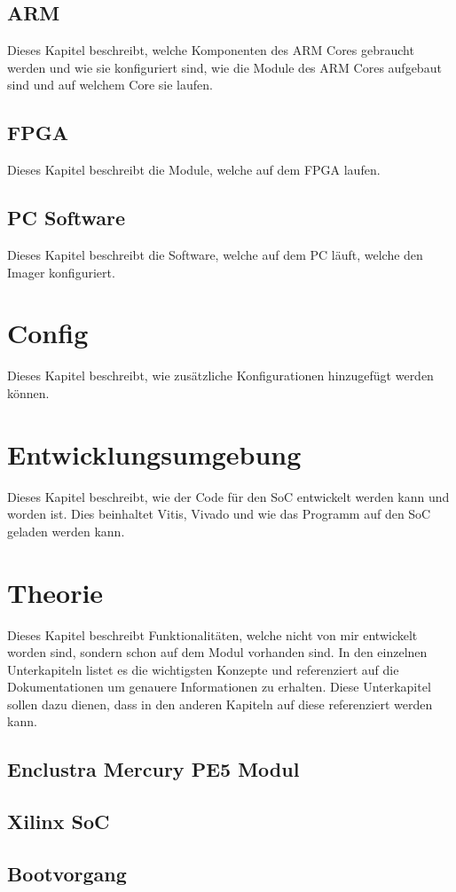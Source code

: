 \documentclass{article}
\begin{document}
\subsection{ARM}
Dieses Kapitel beschreibt, welche Komponenten des ARM Cores gebraucht werden und wie sie konfiguriert sind, wie die Module des ARM Cores aufgebaut sind und auf welchem Core sie laufen.
\subsection{FPGA}
Dieses Kapitel beschreibt die Module, welche auf dem FPGA laufen.
\subsection{PC Software}
Dieses Kapitel beschreibt die Software, welche auf dem PC läuft, welche den Imager konfiguriert.


\section{Config}
Dieses Kapitel beschreibt, wie zusätzliche Konfigurationen hinzugefügt werden können.

\section{Entwicklungsumgebung}
Dieses Kapitel beschreibt, wie der Code für den SoC entwickelt werden kann und worden ist. Dies beinhaltet Vitis, Vivado und wie das Programm auf den SoC geladen werden kann.

\section{Theorie}
Dieses Kapitel beschreibt Funktionalitäten, welche nicht von mir entwickelt worden sind, sondern schon auf dem Modul vorhanden sind. In den einzelnen Unterkapiteln listet es die wichtigsten Konzepte und referenziert auf die Dokumentationen um genauere Informationen zu erhalten. Diese Unterkapitel sollen dazu dienen, dass in den anderen Kapiteln auf diese referenziert werden kann.
\subsection{Enclustra Mercury PE5 Modul}
\subsection{Xilinx SoC}
\subsection{Bootvorgang}
\end{document}
